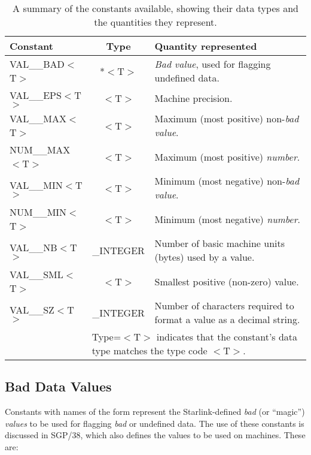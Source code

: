 \begin{table}
\begin{center}
\begin{tabular}{|l|c|p{25em}|}
\hline
{\bf Constant} & {\bf Type} & {\bf Quantity represented} \\
\hline
VAL\_\_BAD$<$T$>$ & *$<$T$>$ & {\em Bad value}, used for flagging undefined
data. 
\\
VAL\_\_EPS$<$T$>$ & $<$T$>$ & Machine precision.
\\
VAL\_\_MAX$<$T$>$ & $<$T$>$ & Maximum (most positive) non-{\em bad value}. 
\\
NUM\_\_MAX$<$T$>$ & $<$T$>$ & Maximum (most positive) {\em number}.
\\
VAL\_\_MIN$<$T$>$ & $<$T$>$ & Minimum (most negative) non-{\em bad value}. 
\\
NUM\_\_MIN$<$T$>$ & $<$T$>$ & Minimum (most negative) {\em number}.
\\
VAL\_\_NB$<$T$>$ & \_INTEGER & Number of basic machine units (bytes) used
by a value.
\\
VAL\_\_SML$<$T$>$ & $<$T$>$ & Smallest positive (non-zero) value.
\\
VAL\_\_SZ$<$T$>$ & \_INTEGER & Number of characters required to format a 
value as a decimal string. 
\\
\hline
\multicolumn{1}{|c}{} &
\multicolumn{2}{l|}{\footnotesize *Type=$<$T$>$ indicates that the 
constant's data type matches the type code $<$T$>$.} \\
\hline
\end{tabular}
\caption{A summary of the constants available, showing their data types and
the quantities they represent.} 
\label{table:constants}
\end{center}
\end{table}

\subsection{Bad Data Values}
\label{section:badconstants}

Constants with names of the form  represent the 
Starlink-defined {\em bad} (or ``magic'') {\em values} to be used for
flagging {\em bad} or undefined data. 
The use of these constants is discussed in SGP/38, which also defines the
values to be used on  machines. 
These are:

